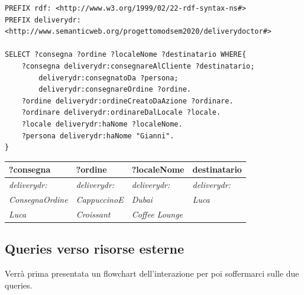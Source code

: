 \documentclass[12pt]{article}
\begin{document}
\begin{lstlisting}[language=SPARQL]
PREFIX rdf: <http://www.w3.org/1999/02/22-rdf-syntax-ns#>
PREFIX deliverydr:
<http://www.semanticweb.org/progettomodsem2020/deliverydoctor#>

SELECT ?consegna ?ordine ?localeNome ?destinatario WHERE{
    ?consegna deliverydr:consegnareAlCliente ?destinatario;
        deliverydr:consegnatoDa ?persona;
        deliverydr:consegnareOrdine ?ordine.
    ?ordine deliverydr:ordineCreatoDaAzione ?ordinare.
    ?ordinare deliverydr:ordinareDalLocale ?locale.
    ?locale deliverydr:haNome ?localeNome.
    ?persona deliverydr:haNome "Gianni".
}
\end{lstlisting}
\begin{tabularx}{\textwidth} { 
  | >{\centering\arraybackslash}X 
  | >{\centering\arraybackslash}X
  | >{\centering\arraybackslash}X
  | >{\centering\arraybackslash}X |}
 \hline
 \textbf{?consegna} & \textbf{?ordine} & \textbf{?localeNome} & \textbf{destinatario} \\
 \hline
 \textit{deliverydr:} & \textit{deliverydr:} & \textit{deliverydr:} & \textit{deliverydr:}  \\
 \textit{ConsegnaOrdine} & \textit{CappuccinoE}& \textit{Dubai} & \textit{Luca}\\
 \textit{Luca} & \textit{Croissant} & \textit{Coffee Lounge}& \\
\hline
\end{tabularx}
\newline
\newline

\subsection{Queries verso risorse esterne}
Verrà prima presentata un flowchart dell'interazione per poi soffermarci sulle due queries.
\end{document}
